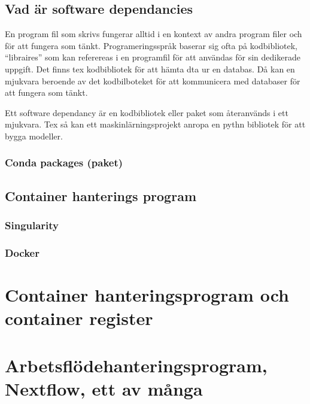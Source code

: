 \documentclass[
  letterpaper,
  DIV=11,
  numbers=noendperiod]{scrreprt}
\begin{document}
\section{Vad är software
dependancies}\label{vad-uxe4r-software-dependancies}

En program fil som skrivs fungerar alltid i en kontext av andra program
filer och för att fungera som tänkt. Programeringsspråk baserar sig ofta
på kodbibliotek, ``libraires'' som kan referereas i en programfil för
att användas för sin dedikerade uppgift. Det finns tex kodbibliotek för
att hämta dta ur en databas. Då kan en mjukvara beroende av det
kodbilboteket för att kommunicera med databaser för att fungera som
tänkt.

Ett software dependancy är en kodbibliotek eller paket som återanvänds i
ett mjukvara. Tex så kan ett maskinlärningsprojekt anropa en pythn
bibliotek för att bygga modeller.

\subsection{Conda packages (paket)}\label{conda-packages-paket}

\section{Container hanterings
program}\label{container-hanterings-program}

\subsection{Singularity}\label{singularity}

\subsection{Docker}\label{docker}


\chapter{Container hanteringsprogram och container
register}\label{container-hanteringsprogram-och-container-register}


\chapter{Arbetsflödehanteringsprogram, Nextflow, ett av
många}\label{arbetsfluxf6dehanteringsprogram-nextflow-ett-av-muxe5nga}
\end{document}

